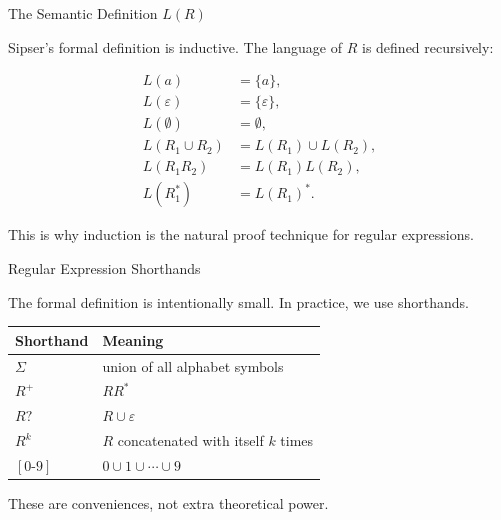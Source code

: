 \documentclass[10pt,aspectratio=169]{beamer}
\newcommand{\eps}{\varepsilon}
\begin{document}
\begin{frame}{The Semantic Definition $L(R)$}

Sipser's formal definition is inductive. The language of $R$ is defined recursively:

\vspace{0.5em}
\begin{align*}
L(a) &= \{a\},\\
L(\eps) &= \{\eps\},\\
L(\emptyset) &= \emptyset,\\
L(R_1\cup R_2) &= L(R_1)\cup L(R_2),\\
L(R_1R_2) &= L(R_1)L(R_2),\\
L(R_1^*) &= L(R_1)^*.
\end{align*}

\vspace{0.4em}
This is why induction is the natural proof technique for regular expressions.

\end{frame}

\begin{frame}{Regular Expression Shorthands}

The formal definition is intentionally small. In practice, we use shorthands.

\vspace{0.5em}
\begin{table}
\centering
\begin{tabular}{ll}
\toprule
\textbf{Shorthand} & \textbf{Meaning} \\
\midrule
$\Sigma$ & union of all alphabet symbols \\
$R^+$ & $RR^*$ \\
$R?$ & $R\cup\eps$ \\
$R^k$ & $R$ concatenated with itself $k$ times \\
$[0\text{-}9]$ & $0\cup1\cup\cdots\cup9$ \\
\bottomrule
\end{tabular}
\end{table}

These are conveniences, not extra theoretical power.

\end{frame}
\end{document}
